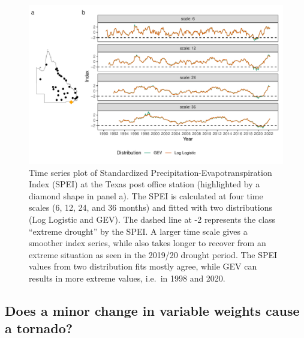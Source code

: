 \documentclass[
]{interact}
\begin{document}
\begin{figure}

{\centering \includegraphics{tidyindex_files/figure-pdf/fig-compute-temporal-1.pdf}

}

\caption{\label{fig-compute-temporal}Time series plot of Standardized
Precipitation-Evapotranspiration Index (SPEI) at the Texas post office
station (highlighted by a diamond shape in panel a). The SPEI is
calculated at four time scales (6, 12, 24, and 36 months) and fitted
with two distributions (Log Logistic and GEV). The dashed line at -2
represents the class ``extreme drought'' by the SPEI. A larger time
scale gives a smoother index series, while also takes longer to recover
from an extreme situation as seen in the 2019/20 drought period. The
SPEI values from two distribution fits mostly agree, while GEV can
results in more extreme values, i.e.~in 1998 and 2020.}

\end{figure}

\hypertarget{does-a-minor-change-in-variable-weights-cause-a-tornado}{%
\subsection{Does a minor change in variable weights cause a
tornado?}\label{does-a-minor-change-in-variable-weights-cause-a-tornado}}
\end{document}
